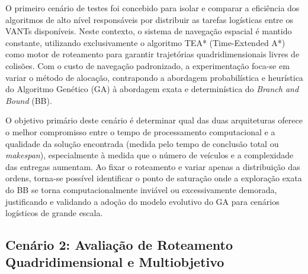 O primeiro cenário de testes foi concebido para isolar e comparar a eficiência dos algoritmos de alto nível responsáveis por distribuir as tarefas logísticas entre os VANTs disponíveis.
Neste contexto, o sistema de navegação espacial é mantido constante, utilizando exclusivamente o algoritmo TEA* (Time-Extended A*) como motor de roteamento para garantir trajetórias quadridimensionais livres de colisões.
Com o custo de navegação padronizado, a experimentação foca-se em variar o método de alocação, contrapondo a abordagem probabilística e heurística do Algoritmo Genético (GA) à abordagem exata e determinística do \textit{Branch and Bound} (BB).

O objetivo primário deste cenário é determinar qual das duas arquiteturas oferece o melhor compromisso entre o tempo de processamento computacional e a qualidade da solução encontrada (medida pelo tempo de conclusão total ou \textit{makespan}), especialmente à medida que o número de veículos e a complexidade das entregas aumentam.
Ao fixar o roteamento e variar apenas a distribuição das ordens, torna-se possível identificar o ponto de saturação onde a exploração exata do BB se torna computacionalmente inviável ou excessivamente demorada, justificando e validando a adoção do modelo evolutivo do GA para cenários logísticos de grande escala.

\subsection{Cenário 2: Avaliação de Roteamento Quadridimensional e Multiobjetivo}

